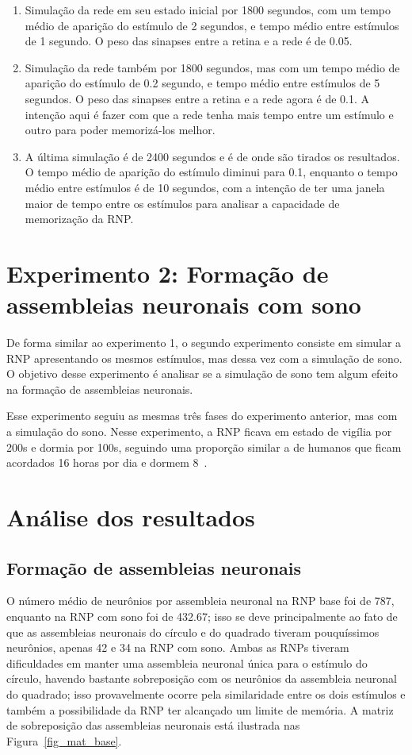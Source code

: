 \begin{enumerate}
  \item Simulação da rede em seu estado inicial por 1800 segundos, com um tempo médio de aparição do estímulo de 2 segundos, e
  tempo médio entre estímulos de 1 segundo. O peso das sinapses entre a retina e a rede é de 0.05.
  \item Simulação da rede também por 1800 segundos, mas com um tempo médio de aparição do estímulo de 0.2 segundo, e
  tempo médio entre estímulos de 5 segundos. O peso das sinapses entre a retina e a rede agora é de 0.1. A intenção aqui é
  fazer com que a rede tenha mais tempo entre um estímulo e outro para poder memorizá-los melhor.
  \item A última simulação é de 2400 segundos e é de onde são tirados os resultados. O tempo médio de aparição do estímulo diminui
  para 0.1, enquanto o tempo médio entre estímulos é de 10 segundos, com a intenção de ter uma janela maior de tempo entre os
  estímulos para analisar a capacidade de memorização da RNP.
\end{enumerate}


\section{Experimento 2: Formação de assembleias neuronais com sono}

De forma similar ao experimento 1, o segundo experimento consiste em simular a RNP apresentando os mesmos estímulos, mas dessa vez
com a simulação de sono. O objetivo desse experimento é analisar se a simulação de sono tem algum efeito na formação de
assembleias neuronais.

Esse experimento seguiu as mesmas três fases do experimento anterior, mas com a simulação do sono. Nesse experimento, a RNP ficava
em estado de vigília por 200s e dormia por 100s, seguindo uma proporção similar a de humanos que ficam acordados 16 horas por dia
e dormem 8~\cite{waterhouseDaily2012}.

\section{Análise dos resultados}

\subsection{Formação de assembleias neuronais}

O número médio de neurônios por assembleia neuronal na RNP base foi de 787, enquanto na RNP com sono foi de 432.67; isso se deve
principalmente ao fato de que as assembleias neuronais do círculo e do quadrado tiveram pouquíssimos neurônios, apenas 42 e 34 na
RNP com sono. Ambas as RNPs tiveram dificuldades em manter uma assembleia neuronal única para o estímulo do círculo, havendo
bastante sobreposição com os neurônios da assembleia neuronal do quadrado; isso provavelmente ocorre pela similaridade entre os
dois estímulos e também a possibilidade da RNP ter alcançado um limite de memória. A matriz de sobreposição das assembleias
neuronais está ilustrada nas Figura~\ref{fig_mat_base}.

